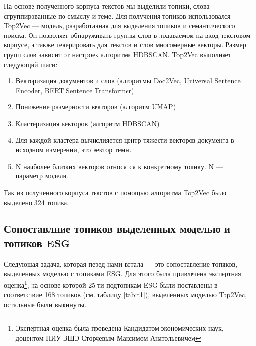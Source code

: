 \documentclass[a4paper, 14pt]{extarticle}
\begin{document}
На основе полученного корпуса текстов мы выделили топики, слова сгруппированные по смыслу и теме. Для получения топиков использовался Top2Vec \cite{link:top2vec} --- модель, разработанная для выделения топиков и семантического поиска. Он позволяет обнаруживать группы слов в подаваемом на вход текстовом корпусе, а также генерировать для текстов и слов многомерные векторы. Размер групп слов зависит от настроек алгоритма HDBSCAN. Top2Vec выполняет следующий шаги:
\begin{enumerate}
    \item Векторизация документов и слов (алгоритмы Doc2Vec, Universal Sentence Encoder, BERT Sentence Transformer)
    \item Понижение размерности векторов (алгоритм UMAP)
    \item Кластеризация векторов (алгоритм HDBSCAN)
    \item Для каждой кластера вычислияется центр тяжести векторов документа в исходном измерении, это вектор темы.
    \item N наиболее близких векторов относятся к конкретному топику. N --- параметр модели.
\end{enumerate}

Так из полученного корпуса текстов с помощью алгоритма Top2Vec было выделено 324 топика.

\subsection{Сопоставлние топиков выделенных моделью и топиков ESG}

Следующая задача, которая перед нами встала --- это сопоставление топиков, 
выделенных моделью с топиками ESG. Для этого была привлечена экспертная оценка\footnote{Экспертная оценка была проведена Кандидатом экономических наук, доцентом НИУ ВШЭ Сторчевым Максимом Анатольевичем}, на основе которой 25-ти подтопикам ESG были поставлены в соответствие 168 топиков (см. таблицу \ref{tab:t1}), выделенных моделью Top2Vec, остальные были выкинуты.
\end{document}
